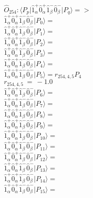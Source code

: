 \documentclass[14pt]{article}
\begin{document}
    $\hat{O}_{254}:  \langle{P_p}\vert \hat{1}_{\alpha}^{+}\hat{0}_{\alpha}^{+}\hat{1}_{\beta}^{-}\hat{0}_{\beta}^{-} \vert{P_q}\rangle => $ \\ 
    $ \hat{1}_{\alpha}^{+}\hat{0}_{\alpha}^{+}\hat{1}_{\beta}^{-}\hat{0}_{\beta}^{-} \vert{P_{0}}\rangle =  $ \\ 
    $ \hat{1}_{\alpha}^{+}\hat{0}_{\alpha}^{+}\hat{1}_{\beta}^{-}\hat{0}_{\beta}^{-} \vert{P_{1}}\rangle =  $ \\ 
    $ \hat{1}_{\alpha}^{+}\hat{0}_{\alpha}^{+}\hat{1}_{\beta}^{-}\hat{0}_{\beta}^{-} \vert{P_{2}}\rangle =  $ \\ 
    $ \hat{1}_{\alpha}^{+}\hat{0}_{\alpha}^{+}\hat{1}_{\beta}^{-}\hat{0}_{\beta}^{-} \vert{P_{3}}\rangle =  $ \\ 
    $ \hat{1}_{\alpha}^{+}\hat{0}_{\alpha}^{+}\hat{1}_{\beta}^{-}\hat{0}_{\beta}^{-} \vert{P_{4}}\rangle =  $ \\ 
    $ \hat{1}_{\alpha}^{+}\hat{0}_{\alpha}^{+}\hat{1}_{\beta}^{-}\hat{0}_{\beta}^{-} \vert{P_{5}}\rangle = {r}_{254,4,5}P_{4} $ \\ 
    ${r}_{254,4,5}\ =\ -1.0 $ \\ 
    $ \hat{1}_{\alpha}^{+}\hat{0}_{\alpha}^{+}\hat{1}_{\beta}^{-}\hat{0}_{\beta}^{-} \vert{P_{6}}\rangle =  $ \\ 
    $ \hat{1}_{\alpha}^{+}\hat{0}_{\alpha}^{+}\hat{1}_{\beta}^{-}\hat{0}_{\beta}^{-} \vert{P_{7}}\rangle =  $ \\ 
    $ \hat{1}_{\alpha}^{+}\hat{0}_{\alpha}^{+}\hat{1}_{\beta}^{-}\hat{0}_{\beta}^{-} \vert{P_{8}}\rangle =  $ \\ 
    $ \hat{1}_{\alpha}^{+}\hat{0}_{\alpha}^{+}\hat{1}_{\beta}^{-}\hat{0}_{\beta}^{-} \vert{P_{9}}\rangle =  $ \\ 
    $ \hat{1}_{\alpha}^{+}\hat{0}_{\alpha}^{+}\hat{1}_{\beta}^{-}\hat{0}_{\beta}^{-} \vert{P_{10}}\rangle =  $ \\ 
    $ \hat{1}_{\alpha}^{+}\hat{0}_{\alpha}^{+}\hat{1}_{\beta}^{-}\hat{0}_{\beta}^{-} \vert{P_{11}}\rangle =  $ \\ 
    $ \hat{1}_{\alpha}^{+}\hat{0}_{\alpha}^{+}\hat{1}_{\beta}^{-}\hat{0}_{\beta}^{-} \vert{P_{12}}\rangle =  $ \\ 
    $ \hat{1}_{\alpha}^{+}\hat{0}_{\alpha}^{+}\hat{1}_{\beta}^{-}\hat{0}_{\beta}^{-} \vert{P_{13}}\rangle =  $ \\ 
    $ \hat{1}_{\alpha}^{+}\hat{0}_{\alpha}^{+}\hat{1}_{\beta}^{-}\hat{0}_{\beta}^{-} \vert{P_{14}}\rangle =  $ \\ 
    $ \hat{1}_{\alpha}^{+}\hat{0}_{\alpha}^{+}\hat{1}_{\beta}^{-}\hat{0}_{\beta}^{-} \vert{P_{15}}\rangle =  $ \\ 
    
\end{document}
